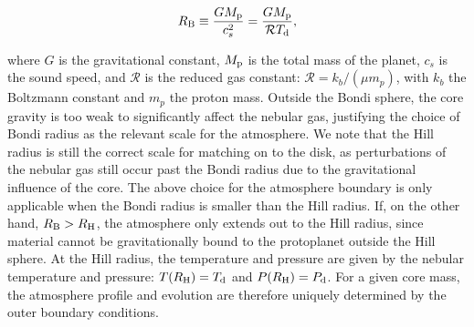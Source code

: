\documentclass[apj]{emulateapj}
\newcommand{\di}{_{\rm d}}
\begin{document}
\begin{equation}
\label{eq:RB}
R_{\rm B} \equiv \frac{G M_{\rm p}}{c_s^2}=\frac{G M_{\rm p}}{\mathcal{R} T\di},
\end{equation}

\noindent where $G$ is the gravitational constant, $M_{\rm p}$ is the total mass of the planet, $c_s$ is the sound speed, and $\mathcal{R}$ is the reduced gas constant: $\mathcal{R}=k_b/(\mu m_p)$, with $k_b$ the Boltzmann constant and $m_p$ the proton mass. Outside the Bondi sphere, the core gravity is too weak to significantly affect the nebular gas, justifying the choice of Bondi radius as the relevant scale for the atmosphere. We note that the Hill radius is still the correct scale for matching on to the disk, as perturbations of the nebular gas still occur past the Bondi radius due to the gravitational influence of the core. The above choice for the atmosphere boundary is only applicable when the Bondi radius is smaller than the Hill radius. If, on the other hand, $R_{\rm B}>R_{\rm H}$, the atmosphere only extends out to the Hill radius, since material cannot be gravitationally bound to the protoplanet outside the Hill sphere. At the Hill radius, the temperature and pressure are given by the nebular temperature and pressure: $T(R_{\rm H})=T_{\rm d}$ and $P(R_{\rm H})=P_{\rm d}$. For a given core mass, the atmosphere profile and evolution are therefore uniquely determined by the outer boundary conditions. 


\end{document}
